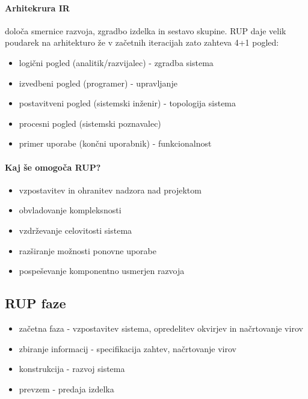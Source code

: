 \documentclass[a4paper,12pt]{report}
\begin{document}
      \paragraph{Arhitekrura IR} določa smernice razvoja, zgradbo izdelka in sestavo skupine.
      RUP daje velik poudarek na arhitekturo že v začetnih iteracijah zato zahteva 4+1 pogled:
         \begin{itemize}
            \item logični pogled (analitik/razvijalec) - zgradba sistema
            \item izvedbeni pogled (programer) - upravljanje
            \item postavitveni pogled (sistemski inženir) - topologija sistema
            \item procesni pogled (sistemski poznavalec)
            \item primer uporabe (končni uporabnik) - funkcionalnost
         \end{itemize}
      
      \paragraph{Kaj še omogoča RUP?}
         \begin{itemize}
            \item vzpostavitev in ohranitev nadzora nad projektom
            \item obvladovanje kompleksnosti
            \item vzdrževanje celovitosti sistema
            \item razširanje možnosti ponovne uporabe
            \item pospeševanje komponentno usmerjen razvoja
         \end{itemize}

      \subsection{RUP faze}
      \begin{itemize}
         \item začetna faza - vzpostavitev sistema, opredelitev okvirjev in načrtovanje virov
         \item zbiranje informacij - specifikacija zahtev, načrtovanje virov
         \item konstrukcija - razvoj sistema
         \item prevzem - predaja izdelka
      \end{itemize}
\end{document}
